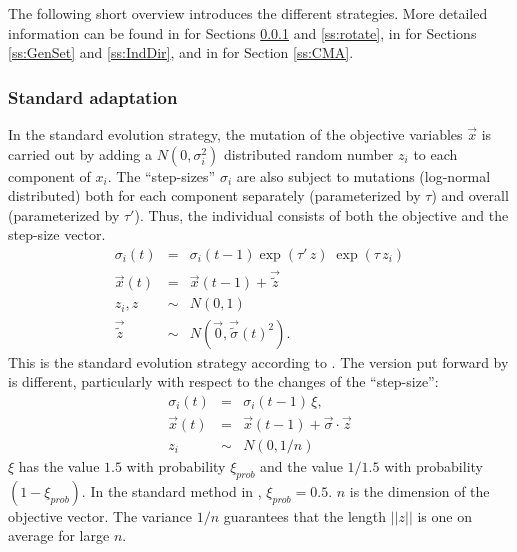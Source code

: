 The following short overview introduces the
different strategies. More detailed information can be found in 
\cite{Baeck:96,Rechenberg:94,Schwefel:95} for Sections 
\ref{ss:standard} and \ref{ss:rotate}, in 
\cite{Hansen:98,Hansen:95,Ostermeier:94} for Sections \ref{ss:GenSet}
and \ref{ss:IndDir}, and in \cite{Hansen:98,Hansen:96} for Section
\ref{ss:CMA}.

\subsubsection{Standard adaptation}
\label{ss:standard}
In the standard evolution strategy, the mutation of the objective
variables $\vec{x}$ is carried out by adding a $N(0,\sigma_i^2)$ 
distributed random number $z_i$ to each component of $x_i$. The
``step-sizes'' $\sigma_i$ are also subject to mutations
(log-normal distributed) both for each component separately
(parameterized by $\tau$) and overall (parameterized by $\tau'$).
Thus, the individual consists of both the objective and the step-size 
vector. 
\begin{eqnarray}
\sigma_i(t) & = & \sigma_i(t-1) \exp( \tau' \, z) \; \exp( \tau \,z_i)\\
\vec{x}(t) & = & \vec{x}(t-1) + \vec{\tilde z}\\
z_i, z & \sim & N(0,1)\\
\vec{\tilde z}& \sim & N(\vec{0}, \vec{{\tilde \sigma}}(t)^2).
\end{eqnarray}
This is the
standard evolution strategy according to \cite{Baeck:96,Schwefel:95}.
The version put forward by \cite{Rechenberg:94} is different,
particularly with respect to the changes of the ``step-size'':
\begin{eqnarray}
\sigma_i(t) & = & \sigma_i(t-1) \,\xi,\\
\vec{x}(t) & = & \vec{x}(t-1) + \vec{\sigma}\cdot \vec{z}\\
z_i & \sim & N(0,1/n)
\end{eqnarray}
$\xi$ has the value $1.5$ with probability $\xi_{prob}$ and 
the value $1/1.5$ with probability $(1-\xi_{prob})$. In the standard
method in \cite{Rechenberg:94}, $\xi_{prob} = 0.5$.
$n$ is the dimension of the objective vector. The 
variance $1/n$ guarantees that the length $||z||$ is one on average
for large $n$.

